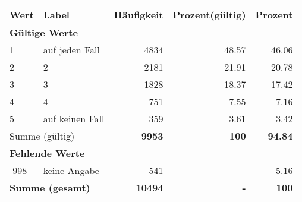      \begin{longtable}{lXrrr}
     \toprule
     \textbf{Wert} & \textbf{Label} & \textbf{Häufigkeit} & \textbf{Prozent(gültig)} & \textbf{Prozent} \\
     \endhead
     \midrule
     \multicolumn{5}{l}{\textbf{Gültige Werte}}\\

     1 &
     \multicolumn{1}{X}{ auf jeden Fall   } &


       \num{4834} &
       \num[round-mode=places,round-precision=2]{48.57} &
         \num[round-mode=places,round-precision=2]{46.06} \\

     2 &
     \multicolumn{1}{X}{ 2   } &


       \num{2181} &
       \num[round-mode=places,round-precision=2]{21.91} &
         \num[round-mode=places,round-precision=2]{20.78} \\

     3 &
     \multicolumn{1}{X}{ 3   } &


       \num{1828} &
       \num[round-mode=places,round-precision=2]{18.37} &
         \num[round-mode=places,round-precision=2]{17.42} \\

     4 &
     \multicolumn{1}{X}{ 4   } &


       \num{751} &
       \num[round-mode=places,round-precision=2]{7.55} &
         \num[round-mode=places,round-precision=2]{7.16} \\

     5 &
     \multicolumn{1}{X}{ auf keinen Fall   } &


       \num{359} &
       \num[round-mode=places,round-precision=2]{3.61} &
         \num[round-mode=places,round-precision=2]{3.42} \\
     \midrule
     \multicolumn{2}{l}{Summe (gültig)} &
       \textbf{\num{9953}} &
     \textbf{\num{100}} &
       \textbf{\num[round-mode=places,round-precision=2]{94.84}} \\
     \multicolumn{5}{l}{\textbf{Fehlende Werte}}\\
       -998 &
       keine Angabe &
         \num{541} &
        - &
         \num[round-mode=places,round-precision=2]{5.16} \\
     \midrule
     \multicolumn{2}{l}{\textbf{Summe (gesamt)}} &
          \textbf{\num{10494}} &
        \textbf{-} &
        \textbf{\num{100}} \\
     \bottomrule
     \end{longtable}
     
